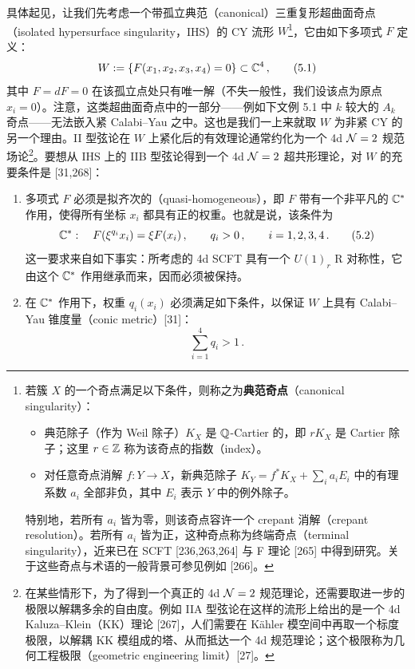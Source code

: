 具体起见，让我们先考虑一个带孤立典范（canonical）三重复形超曲面奇点（isolated hypersurface singularity，IHS）的 CY 流形 $W$\footnote{若簇 $X$ 的一个奇点满足以下条件，则称之为\textbf{典范奇点}（canonical singularity）：\begin{itemize}[leftmargin=1.2em,itemsep=1pt,topsep=2pt]\item 典范除子（作为 Weil 除子）$K_X$ 是 $\mathbb{Q}$-Cartier 的，即 $rK_X$ 是 Cartier 除子；这里 $r\in\mathbb{Z}$ 称为该奇点的指数（index）。\item 对任意奇点消解 $f:Y\to X$，新典范除子 $K_Y=f^*K_X+\sum_i a_iE_i$ 中的有理系数 $a_i$ 全部非负，其中 $E_i$ 表示 $Y$ 中的例外除子。\end{itemize}特别地，若所有 $a_i$ 皆为零，则该奇点容许一个 crepant 消解（crepant resolution）。若所有 $a_i$ 皆为正，这种奇点称为终端奇点（terminal singularity），近来已在 SCFT [236,263,264] 与 F 理论 [265] 中得到研究。关于这些奇点与术语的一般背景可参见例如 [266]。}，它由如下多项式 $F$ 定义：
\begin{equation}
  W := \{ F(x_1,x_2,x_3,x_4) = 0 \} \subset \mathbb{C}^4 \,,
  \tag{5.1}
\end{equation}
其中 $F=dF=0$ 在该孤立点处只有唯一解（不失一般性，我们设该点为原点 $x_i=0$）。注意，这类超曲面奇点中的一部分——例如下文例 5.1 中 $k$ 较大的 $A_k$ 奇点——无法嵌入紧 Calabi--Yau 之中。这也是我们一上来就取 $W$ 为非紧 CY 的另一个理由。II 型弦论在 $W$ 上紧化后的有效理论通常约化为一个 4d $\mathcal{N}=2$ 规范场论\footnote{在某些情形下，为了得到一个真正的 4d $\mathcal{N}=2$ 规范理论，还需要取进一步的极限以解耦多余的自由度。例如 IIA 型弦论在这样的流形上给出的是一个 4d Kaluza--Klein（KK）理论 [267]，人们需要在 Kähler 模空间中再取一个标度极限，以解耦 KK 模组成的塔、从而抵达一个 4d 规范理论；这个极限称为几何工程极限（geometric engineering limit）[27]。}。要想从 IHS 上的 IIB 型弦论得到一个 4d $\mathcal{N}=2$ 超共形理论，对 $W$ 的充要条件是 [31,268]：
\begin{enumerate}[label=\arabic*.,leftmargin=2.2em,itemsep=3pt,topsep=4pt]
  \item 多项式 $F$ 必须是拟齐次的（quasi-homogeneous），即 $F$ 带有一个非平凡的 $\mathbb{C}^*$ 作用，使得所有坐标 $x_i$ 都具有正的权重。也就是说，该条件为
  \begin{equation}
    \mathbb{C}^*:\quad F(\xi^{q_i}x_i) = \xi F(x_i)\,,\qquad q_i>0\,,\qquad i=1,2,3,4\,.
    \tag{5.2}
  \end{equation}
  这一要求来自如下事实：所考虑的 4d SCFT 具有一个 $U(1)_r$ R 对称性，它由这个 $\mathbb{C}^*$ 作用继承而来，因而必须被保持。
  \item 在 $\mathbb{C}^*$ 作用下，权重 $q_i(x_i)$ 必须满足如下条件，以保证 $W$ 上具有 Calabi--Yau 锥度量（conic metric）[31]：
  \begin{equation}
    \sum_{i=1}^{4} q_i > 1\,.
    \tag{5.3}
  \end{equation}
\end{enumerate}

